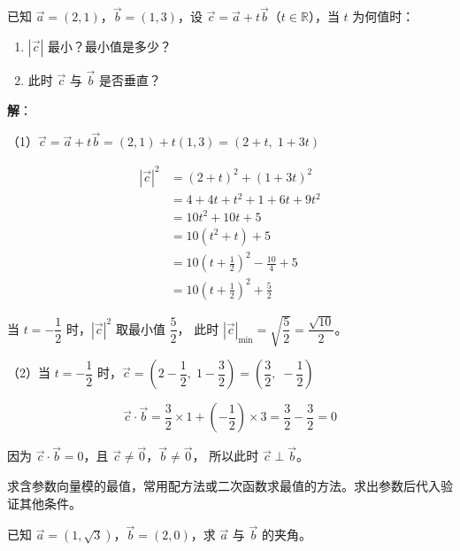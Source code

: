 \documentclass[12pt, a4paper]{ctexart}
\begin{document}
\begin{examplebox}
已知 $\vec{a}=(2,1)$，$\vec{b}=(1,3)$，设 $\vec{c} = \vec{a} + t\vec{b}$（$t \in \mathbb{R}$），当 $t$ 为何值时：
\begin{enumerate}[label=(\arabic*)]
  \item $|\vec{c}|$ 最小？最小值是多少？
  \item 此时 $\vec{c}$ 与 $\vec{b}$ 是否垂直？
\end{enumerate}
\end{examplebox}

\textbf{解}：

（1）$\vec{c} = \vec{a} + t\vec{b} = (2,1) + t(1,3) = (2+t,\; 1+3t)$

\begin{align*}
|\vec{c}|^2 &= (2+t)^2 + (1+3t)^2 \\
  &= 4 + 4t + t^2 + 1 + 6t + 9t^2 \\
  &= 10t^2 + 10t + 5 \\
  &= 10\!\left(t^2 + t\right) + 5 \\
  &= 10\!\left(t + \frac{1}{2}\right)^2 - \frac{10}{4} + 5 \\
  &= 10\!\left(t + \frac{1}{2}\right)^2 + \frac{5}{2}
\end{align*}

当 $t = -\dfrac{1}{2}$ 时，$|\vec{c}|^2$ 取最小值 $\dfrac{5}{2}$，
此时 $|\vec{c}|_{\min} = \sqrt{\dfrac{5}{2}} = \dfrac{\sqrt{10}}{2}$。

（2）当 $t=-\dfrac{1}{2}$ 时，$\vec{c} = \left(2-\dfrac{1}{2},\; 1-\dfrac{3}{2}\right) = \left(\dfrac{3}{2},\; -\dfrac{1}{2}\right)$

\[
\vec{c}\cdot\vec{b} = \frac{3}{2}\times 1 + \left(-\frac{1}{2}\right)\times 3 = \frac{3}{2} - \frac{3}{2} = 0
\]

因为 $\vec{c}\cdot\vec{b} = 0$，且 $\vec{c} \neq \vec{0}$，$\vec{b} \neq \vec{0}$，
所以此时 $\vec{c} \perp \vec{b}$。

\begin{tipbox}[方法总结]
求含参数向量模的最值，常用配方法或二次函数求最值的方法。求出参数后代入验证其他条件。
\end{tipbox}

\begin{examplebox}[【例题9】用坐标求向量夹角]
已知 $\vec{a}=(1,\sqrt{3})$，$\vec{b}=(2,0)$，求 $\vec{a}$ 与 $\vec{b}$ 的夹角。
\end{examplebox}
\end{document}
